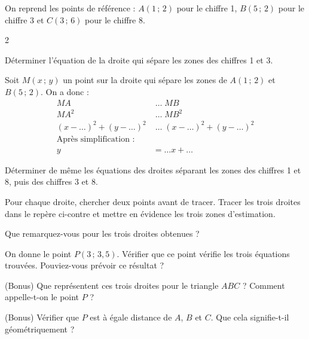 On reprend les points de référence : $A(1\,;\,2)$ pour le chiffre 1, $B(5\,;\,2)$ pour le chiffre 3 et $C(3\,;\,6)$ pour le chiffre 8.

		\begin{multicols}{2}

			\begin{MADenumerate}

				\item Déterminer l'équation de la droite qui sépare les zones des chiffres 1 et 3.

				\begin{exemple}[Aide]
					Soit $M(x\,;\,y)$ un point sur la droite qui sépare les zones de $A(1\,;\,2)$ et $B(5\,;\,2)$.
					On a donc :
					\begingroup\small
					\begin{align*}
						MA                            & \; \ldots\; MB                        \\
						MA^2                          & \; \ldots\; MB^2                      \\
						(x-\ldots)^2+(y-\ldots)^2     & \; \ldots\; (x-\ldots)^2+(y-\ldots)^2 \\
						\text{Après simplification :} &                                       \\
						y                             & = \ldots x+\ldots
					\end{align*}
					\endgroup
				\end{exemple}

				\item Déterminer de même les équations des droites séparant les zones des chiffres 1 et 8, puis des chiffres 3 et 8.

				\item Pour chaque droite, chercher deux points avant de tracer. Tracer les trois droites dans le repère ci-contre et mettre en évidence les trois zones d'estimation.

				\item Que remarquez-vous pour les trois droites obtenues ?

				\item On donne le point $P(3\,;\,3{,}5)$. Vérifier que ce point vérifie les trois équations trouvées. Pouviez-vous prévoir ce résultat ?

				\item (Bonus) Que représentent ces trois droites pour le triangle $ABC$ ? Comment appelle-t-on le point $P$ ?

				\item (Bonus) Vérifier que $P$ est à égale distance de $A$, $B$ et $C$. Que cela signifie-t-il géométriquement ?


\end{MADenumerate}
\end{multicols}

